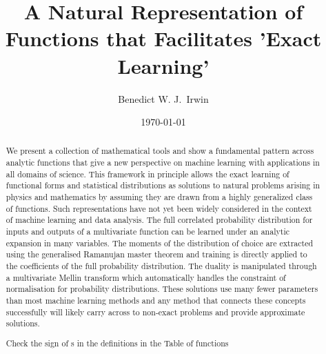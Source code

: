 \documentclass[journal=jcisd8,manuscript=article,layout=onecolumn,pdftex,floatfix,amsmath,amssymb,10pt]{achemso}
\title{A Natural Representation of Functions that Facilitates 'Exact Learning'}
\author{Benedict W. J.~Irwin}
\affiliation{Optibrium, F5-6 Blenheim House, Cambridge Innovation Park,
Denny End Road, Cambridge, CB25 9PB, United Kingdom}
\date{\today}
\begin{document}


\begin{abstract}
We present a collection of mathematical tools and show a fundamental pattern across analytic functions that give a new perspective on machine learning with applications in all domains of science. This framework in principle allows the exact learning of functional forms and statistical distributions as solutions to natural problems arising in physics and mathematics by assuming they are drawn from a highly generalized class of functions. Such representations have not yet been widely considered in the context of machine learning and data analysis. The full correlated probability distribution for inputs and outputs of a multivariate function can be learned under an analytic expansion in many variables. The moments of the distribution of choice are extracted using the generalised Ramanujan master theorem and training is directly applied to the coefficients of the full probability distribution. The duality is manipulated through a multivariate Mellin transform which automatically handles the constraint of normalisation for probability distributions. These solutions use many fewer parameters than most machine learning methods and any method that connects these concepts successfully will likely carry across to non-exact problems and provide approximate solutions.


{\color{red} Check the sign of s in the definitions in the Table of functions}




\end{abstract}
\end{document}
